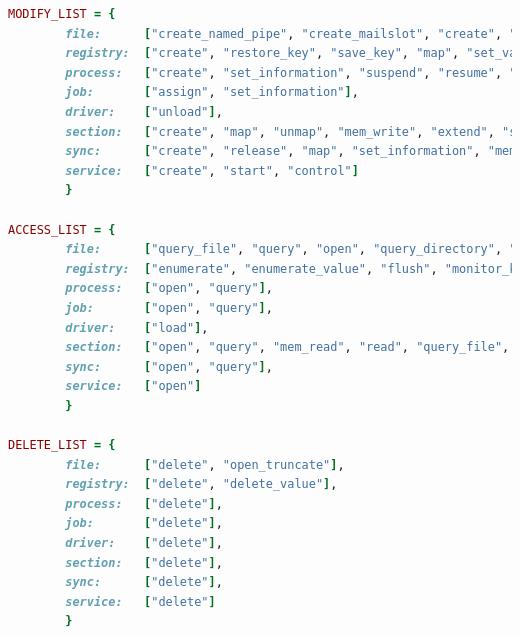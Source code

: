 \begin{lstlisting}[numbers=none,language=ruby,caption={Mapping of generalize system calls with regard to behavioral profile },label={lbl:ntapi}]
MODIFY_LIST = {
        file:      ["create_named_pipe", "create_mailslot", "create", "rename", "lock", "set_information", "write", "unlock", "flush_buffer", "suspend", "map", "resume"],
        registry:  ["create", "restore_key", "save_key", "map", "set_value", "set_information", "compress_key", "lock", "resume", "suspend", "mem_write"],
        process:   ["create", "set_information", "suspend", "resume", "unmap", "map"],
        job:       ["assign", "set_information"],
        driver:    ["unload"],
        section:   ["create", "map", "unmap", "mem_write", "extend", "suspend", "resume", "set_information", "release"],
        sync:      ["create", "release", "map", "set_information", "mem_write"],
        service:   ["create", "start", "control"]
        }

ACCESS_LIST = {
        file:      ["query_file", "query", "open", "query_directory", "query_information", "read", "monitor_dir", "control", "device_control", "fs_control", "query_value"],
        registry:  ["enumerate", "enumerate_value", "flush", "monitor_key", "open", "query", "query_value", "mem_read"],
        process:   ["open", "query"],
        job:       ["open", "query"],
        driver:    ["load"],
        section:   ["open", "query", "mem_read", "read", "query_file", "query_system"],
        sync:      ["open", "query"],
        service:   ["open"]
        }

DELETE_LIST = {
        file:      ["delete", "open_truncate"],
        registry:  ["delete", "delete_value"],
        process:   ["delete"],
        job:       ["delete"],
        driver:    ["delete"],
        section:   ["delete"],
        sync:      ["delete"],
        service:   ["delete"]
        }

\end{lstlisting}

